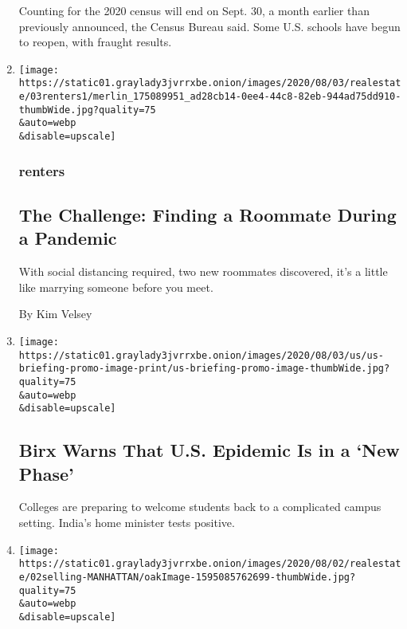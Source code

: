 \begin{enumerate}
  Counting for the 2020 census will end on Sept. 30, a month earlier
  than previously announced, the Census Bureau said. Some U.S. schools
  have begun to reopen, with fraught results.
\item
  \href{/2020/08/03/realestate/coronavirus-roommate-renters.html}{}

  \texttt{[image: https://static01.graylady3jvrrxbe.onion/images/2020/08/03/realestate/03renters1/merlin\_175089951\_ad28cb14-0ee4-44c8-82eb-944ad75dd910-thumbWide.jpg?quality=75\\\&auto=webp\\\&disable=upscale]}

  \hypertarget{renters}{%
  \subsubsection{renters}\label{renters}}

  \hypertarget{the-challenge-finding-a-roommate-during-a-pandemic}{%
  \subsection{The Challenge: Finding a Roommate During a
  Pandemic}\label{the-challenge-finding-a-roommate-during-a-pandemic}}

  With social distancing required, two new roommates discovered, it's a
  little like marrying someone before you meet.

  By Kim Velsey
\item
  \href{/2020/08/02/world/coronavirus-covid-19.html}{}

  \texttt{[image: https://static01.graylady3jvrrxbe.onion/images/2020/08/03/us/us-briefing-promo-image-print/us-briefing-promo-image-thumbWide.jpg?quality=75\\\&auto=webp\\\&disable=upscale]}

  \hypertarget{birx-warns-that-us-epidemic-is-in-a-new-phase}{%
  \subsection{Birx Warns That U.S. Epidemic Is in a `New
  Phase'}\label{birx-warns-that-us-epidemic-is-in-a-new-phase}}

  Colleges are preparing to welcome students back to a complicated
  campus setting. India's home minister tests positive.
\item
  \href{/2020/08/02/realestate/homes-that-sold-for-around-600000.html}{}

  \texttt{[image: https://static01.graylady3jvrrxbe.onion/images/2020/08/02/realestate/02selling-MANHATTAN/oakImage-1595085762699-thumbWide.jpg?quality=75\\\&auto=webp\\\&disable=upscale]}


\end{enumerate}
